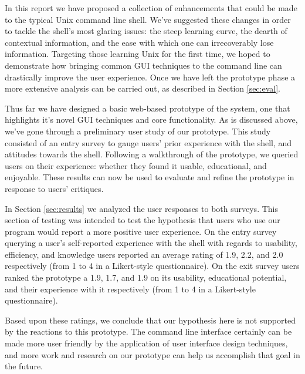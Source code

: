 In this report we have proposed a collection of enhancements that
could be made to the typical Unix command line shell. We've suggested these
changes in order to tackle the shell's most glaring issues: the steep learning
curve, the dearth of contextual information, and the ease with which one can
irrecoverably lose information. Targeting those learning Unix for the first
time, we hoped to demonstrate how bringing common GUI techniques to the command
line can drastically improve the user experience. Once we have left the
prototype phase a more extensive analysis can be carried out, as described in
Section \ref{sec:eval}.

Thus far we have designed a basic web-based prototype of the system, one that
highlights it's novel GUI techniques and core functionality. As is discussed
above, we've gone through a preliminary user study of our prototype. This study
consisted of an entry survey to gauge users' prior experience with the shell,
and attitudes towards the shell. Following a walkthrough of the prototype, we
queried users on their experience: whether they found it usable, educational,
and enjoyable. These results can now be used to evaluate and refine the
prototype in response to users' critiques.

In Section \ref{sec:results} we analyzed the user responses to both surveys. This
section of testing was intended to test the hypothesis that users who use our
program would report a more positive user experience. On the entry survey
querying a user's self-reported experience with the shell with regards to
usability, efficiency, and knowledge users reported an average rating of 1.9,
2.2, and 2.0 respectively (from 1 to 4 in a Likert-style questionnaire). On the
exit survey users ranked the prototype a 1.9, 1.7, and 1.9 on its usability,
educational potential, and their experience with it respectively (from 1 to 4 in
a Likert-style questionnaire).

Based upon these ratings, we conclude that our hypothesis here is not supported
by the reactions to this prototype. The command line interface certainly can be
made more user friendly by the application of user interface design techniques,
and more work and research on our prototype can help us accomplish that goal in
the future.





